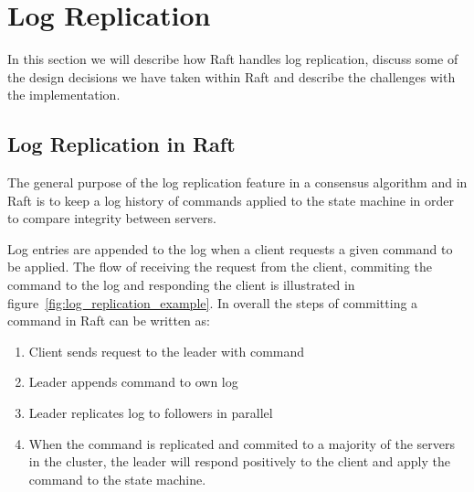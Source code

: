 \section{Log Replication} %
\label{sec:log_replication}

In this section we will describe how Raft handles log replication, discuss some of the design decisions we have taken within Raft and describe the challenges with the implementation.

\subsection{Log Replication in Raft} %
\label{sub:log_replication_in_raft}

The general purpose of the log replication feature in a consensus algorithm and in Raft is to keep a log history of commands applied to the state machine in order to compare integrity between servers.

Log entries are appended to the log when a client requests a given command to be applied. The flow of receiving the request from the client, commiting the command to the log and responding the client is illustrated in figure~\ref{fig:log_replication_example}. In overall the steps of committing a command in Raft can be written as:

\begin{enumerate}
  \item Client sends request to the leader with command
  \item Leader appends command to own log
  \item Leader replicates log to followers in parallel
  \item When the command is replicated and commited to a majority of the servers in the cluster, the leader will respond positively to the client and apply the command to the state machine. \label{enum:client_request_final}

\end{enumerate}

